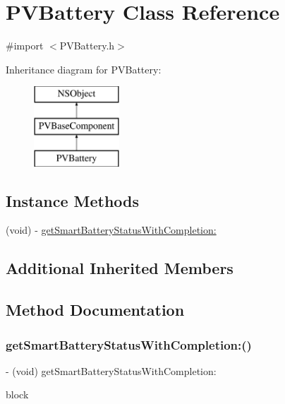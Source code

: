 \hypertarget{interface_p_v_battery}{}\section{P\+V\+Battery Class Reference}
\label{interface_p_v_battery}


{\ttfamily \#import $<$P\+V\+Battery.\+h$>$}

Inheritance diagram for P\+V\+Battery\+:\begin{figure}[H]
\begin{center}
\leavevmode
\includegraphics[height=3.000000cm]{interface_p_v_battery}
\end{center}
\end{figure}
\subsection*{Instance Methods}
\begin{DoxyCompactItemize}
\item 
(void) -\/ \hyperlink{interface_p_v_battery_ad4146aa159f9bf4beca2f1b5ee6b3d8d}{get\+Smart\+Battery\+Status\+With\+Completion\+:}
\end{DoxyCompactItemize}
\subsection*{Additional Inherited Members}


\subsection{Method Documentation}
\mbox{\label{interface_p_v_battery_ad4146aa159f9bf4beca2f1b5ee6b3d8d}} 
\subsubsection{\texorpdfstring{get\+Smart\+Battery\+Status\+With\+Completion\+:()}{getSmartBatteryStatusWithCompletion:()}}
{\footnotesize\ttfamily -\/ (void) get\+Smart\+Battery\+Status\+With\+Completion\+: \begin{DoxyParamCaption}\item[{(void($^\wedge$)(\hyperlink{struct_p_v_battery_status}{P\+V\+Battery\+Status} battery\+Status, N\+S\+Error $\ast$error))}]{block }\end{DoxyParamCaption}}

